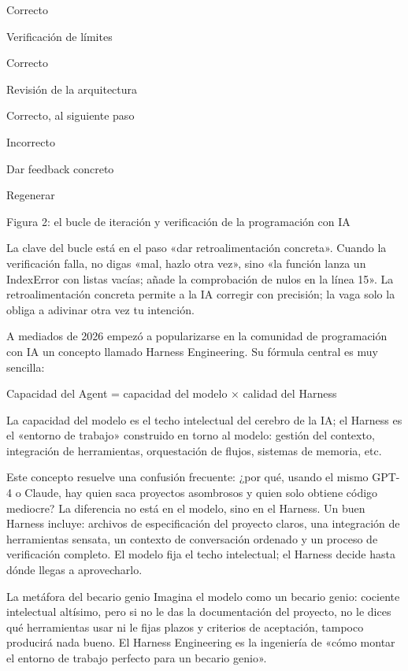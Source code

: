 Correcto

Verificación de límites

Correcto

Revisión de la arquitectura

Correcto, al siguiente paso

Incorrecto

Dar feedback concreto

Regenerar

\begin{center}\small\color{gray}Figura 2: el bucle de iteración y verificación de la programación con IA\end{center}

La clave del bucle está en el paso «dar retroalimentación concreta». Cuando la verificación falla, no digas «mal, hazlo otra vez», sino «la función lanza un IndexError con listas vacías; añade la comprobación de nulos en la línea 15». La retroalimentación concreta permite a la IA corregir con precisión; la vaga solo la obliga a adivinar otra vez tu intención.


A mediados de 2026 empezó a popularizarse en la comunidad de programación con IA un concepto llamado Harness Engineering. Su fórmula central es muy sencilla:

Capacidad del Agent = capacidad del modelo × calidad del Harness

La capacidad del modelo es el techo intelectual del cerebro de la IA; el Harness es el «entorno de trabajo» construido en torno al modelo: gestión del contexto, integración de herramientas, orquestación de flujos, sistemas de memoria, etc.

Este concepto resuelve una confusión frecuente: ¿por qué, usando el mismo GPT-4 o Claude, hay quien saca proyectos asombrosos y quien solo obtiene código mediocre? La diferencia no está en el modelo, sino en el Harness. Un buen Harness incluye: archivos de especificación del proyecto claros, una integración de herramientas sensata, un contexto de conversación ordenado y un proceso de verificación completo. El modelo fija el techo intelectual; el Harness decide hasta dónde llegas a aprovecharlo.

\begin{tcbinfo}{La metáfora del becario genio}
Imagina el modelo como un becario genio: cociente intelectual altísimo, pero si no le das la documentación del proyecto, no le dices qué herramientas usar ni le fijas plazos y criterios de aceptación, tampoco producirá nada bueno. El Harness Engineering es la ingeniería de «cómo montar el entorno de trabajo perfecto para un becario genio».

\end{tcbinfo}

